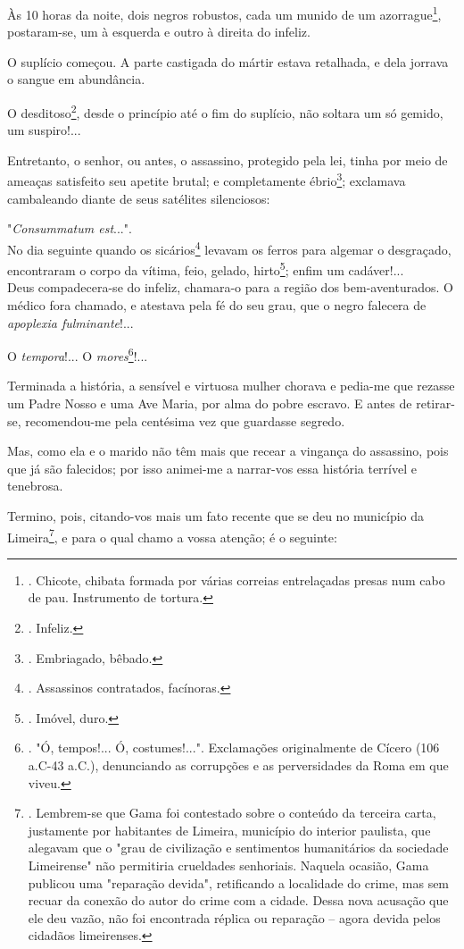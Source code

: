Às 10 horas da noite, dois negros robustos, cada um munido de um
azorrague\footnote{. Chicote, chibata formada por várias correias
  entrelaçadas presas num cabo de pau. Instrumento de tortura.},
postaram-se, um à esquerda e outro à direita do infeliz.

O suplício começou. A parte castigada do mártir estava retalhada, e dela
jorrava o sangue em abundância.

O desditoso\footnote{. Infeliz.}, desde o princípio até o fim do
suplício, não soltara um só gemido, um suspiro!...

Entretanto, o senhor, ou antes, o assassino, protegido pela lei, tinha
por meio de ameaças satisfeito seu apetite brutal; e completamente
ébrio\footnote{. Embriagado, bêbado.}; exclamava cambaleando diante de
seus satélites silenciosos:

"\emph{Consummatum est}...".\\
No dia seguinte quando os sicários\footnote{. Assassinos contratados,
  facínoras.} levavam os ferros para algemar o desgraçado, encontraram o
corpo da vítima, feio, gelado, hirto\footnote{. Imóvel, duro.}; enfim um
cadáver!...\\
Deus compadecera-se do infeliz, chamara-o para a região dos
bem-aventurados. O médico fora chamado, e atestava pela fé do seu grau,
que o negro falecera de \emph{apoplexia fulminante}!...

O \emph{tempora}!... O \emph{mores}\footnote{. "Ó, tempos!... Ó,
  costumes!...". Exclamações originalmente de Cícero (106 a.C-43 a.C.),
  denunciando as corrupções e as perversidades da Roma em que viveu.}!...

Terminada a história, a sensível e virtuosa mulher chorava e pedia-me
que rezasse um Padre Nosso e uma Ave Maria, por alma do pobre escravo. E
antes de retirar-se, recomendou-me pela centésima vez que guardasse
segredo.

Mas, como ela e o marido não têm mais que recear a vingança do
assassino, pois que já são falecidos; por isso animei-me a narrar-vos
essa história terrível e tenebrosa.

Termino, pois, citando-vos mais um fato recente que se deu no município
da Limeira\footnote{. Lembrem-se que Gama foi contestado sobre o
  conteúdo da terceira carta, justamente por habitantes de Limeira,
  município do interior paulista, que alegavam que o "grau de
  civilização e sentimentos humanitários da sociedade Limeirense" não
  permitiria crueldades senhoriais. Naquela ocasião, Gama publicou uma
  "reparação devida", retificando a localidade do crime, mas sem recuar
  da conexão do autor do crime com a cidade. Dessa nova acusação que ele
  deu vazão, não foi encontrada réplica ou reparação -- agora devida
  pelos cidadãos limeirenses.}, e para o qual chamo a vossa atenção; é o
seguinte:

